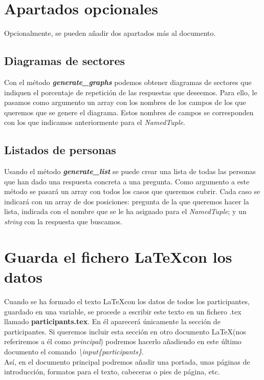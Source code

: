 \documentclass[a4paper, 12pt]{book}
\begin{document}
\section{Apartados opcionales}
\label{sec:opcional}
Opcionalmente, se pueden añadir dos apartados más al documento.

\subsection{Diagramas de sectores}
\label{subsec:diagramas}
Con el método \textbf{\textit{generate\_graphs}} podemos obtener diagramas de sectores que indiquen el porcentaje de repetición de las respuestas que deseemos. Para ello, le pasamos como argumento un array con los nombres de los campos de los que queremos que se genere el diagrama. Estos nombres de campos se corresponden con los que indicamos anteriormente para el \textit{NamedTuple}.

\subsection{Listados de personas}
\label{subsec:listados}
Usando el método \textbf{\textit{generate\_list}} se puede crear una lista de todas las personas que han dado una respuesta concreta a una pregunta. Como argumento a este método se pasará un array con todos los casos que queremos cubrir. Cada caso se indicará con un array de dos posiciones: pregunta de la que queremos hacer la lista, indicada con el nombre que se le ha asignado para el \textit{NamedTuple}; y un \textit{string} con la respuesta que buscamos.\\


\section{Guarda el fichero \LaTeX con los datos}
\label{sec:guardaLatex}
Cuando se ha formado el texto \LaTeX con los datos de todos los participantes, guardado en una variable, se procede a escribir este texto en un fichero .tex llamado \textbf{participants.tex}. En él aparecerá únicamente la sección de participantes. Si queremos incluir esta sección en otro documento \LaTeX (nos referiremos a él como \textit{principal}) podremos hacerlo añadiendo en este último documento el comando \mbox{\textit{\textbackslash input\{participants\}}}.\\

Así, en el documento principal podremos añadir una portada, unas páginas de introducción, formatos para el texto, cabeceras o pies de página, etc.\\
\end{document}
